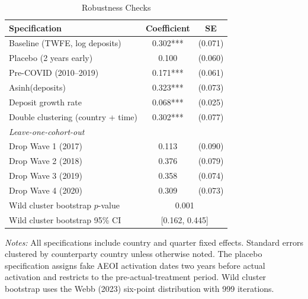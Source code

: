 \begin{table}[H]
\centering
\caption{Robustness Checks}
\label{tab:robust}
\begin{threeparttable}
\begin{tabular}{lcc}
\toprule
Specification & Coefficient & SE \\
\midrule
Baseline (TWFE, log deposits) & 0.302*** & (0.071) \\
Placebo (2 years early) & 0.100 & (0.060) \\
Pre-COVID (2010--2019) & 0.171*** & (0.061) \\
Asinh(deposits) & 0.323*** & (0.073) \\
Deposit growth rate & 0.068*** & (0.025) \\
Double clustering (country + time) & 0.302*** & (0.077) \\
\midrule
\multicolumn{3}{l}{\textit{Leave-one-cohort-out}} \\
\quad Drop Wave 1 (2017) & 0.113 & (0.090) \\
\quad Drop Wave 2 (2018) & 0.376 & (0.079) \\
\quad Drop Wave 3 (2019) & 0.358 & (0.074) \\
\quad Drop Wave 4 (2020) & 0.309 & (0.073) \\
\midrule
Wild cluster bootstrap $p$-value & \multicolumn{2}{c}{0.001} \\
Wild cluster bootstrap 95\% CI & \multicolumn{2}{c}{[0.162, 0.445]} \\
\bottomrule
\end{tabular}
\begin{tablenotes}[flushleft]
\small
\item \textit{Notes:} All specifications include country and quarter fixed effects. Standard errors clustered by counterparty country unless otherwise noted. The placebo specification assigns fake AEOI activation dates two years before actual activation and restricts to the pre-actual-treatment period. Wild cluster bootstrap uses the Webb (2023) six-point distribution with 999 iterations.
\end{tablenotes}
\end{threeparttable}
\end{table}
